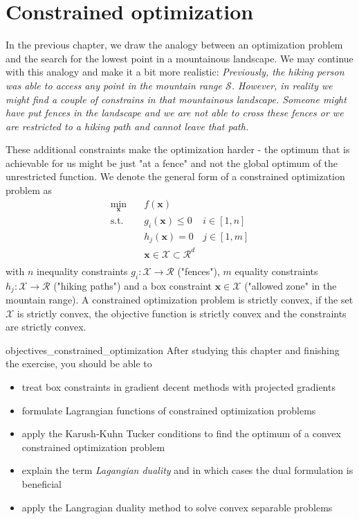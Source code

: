 \chapter{Constrained optimization}
In the previous chapter, we draw the analogy between an optimization problem and the search for the lowest point in a mountainous landscape. We may continue with this analogy and make it a bit more realistic: \emph{Previously, the hiking person was able to access any point in the mountain range $\mathcal{S}$. However, in reality we might find a couple of constrains in that mountainous landscape. Someone might have put fences in the landscape and we are not able to cross these fences or we are restricted to a hiking path and cannot leave that path.}

These additional constraints make the optimization harder - the optimum that is achievable for us might be just "at a fence" and not the global optimum of the unrestricted function.
We denote the general form of a constrained optimization problem as 
\begin{equation}
    \begin{aligned}
        \min_{\mathbf{x}} \quad & f(\mathbf{x})\\
        \textrm{s.t.} \quad & g_i(\mathbf{x}) \le 0    &i \in [1, n]\\
                            & h_j(\mathbf{x}) = 0  &j \in [1, m]\\
                            & \mathbf{x} \in \mathcal{X} \subset \mathcal{R}^d\\
    \end{aligned}
    \label{eq:constrained_optimization}
\end{equation}
with $n$ inequality constraints $g_i : \mathcal{X} \rightarrow \mathcal{R}$ ("fences"), $m$ equality constraints $h_j: \mathcal{X} \rightarrow \mathcal{R}$ ("hiking paths") and a box constraint $\mathbf{x} \in \mathcal{X}$ ("allowed zone" in the mountain range). A constrained optimization problem is strictly convex, if the set $\mathcal{X}$ is strictly convex, the objective function is strictly convex and the constraints are strictly convex.

\begin{objectives}{}{objectives_constrained_optimization}
After studying this chapter and finishing the exercise, you should be able to 
\begin{itemize}[label=$\dots$]
    \item treat box constraints in gradient decent methods with projected gradients
    \item formulate Lagrangian functions of constrained optimization problems
    \item apply the Karush-Kuhn Tucker conditions to find the optimum of a convex constrained optimization problem
    \item explain the term \emph{Lagangian duality} and in which cases the dual formulation is beneficial
    \item apply the Langragian duality method to solve convex separable problems
\end{itemize}
\end{objectives}

